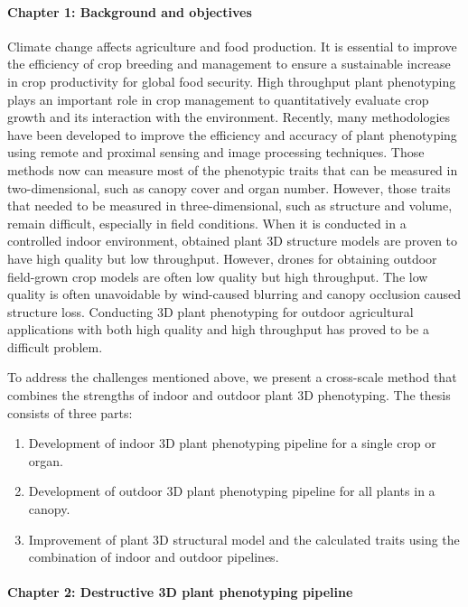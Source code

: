 \begin{eabstract}
  \paragraph{Chapter 1: Background and objectives}

  Climate change affects agriculture and food production. It is essential to improve the efficiency of crop breeding and management to ensure a sustainable increase in crop productivity for global food security. High throughput plant phenotyping plays an important role in crop management to quantitatively evaluate crop growth and its interaction with the environment. Recently, many methodologies have been developed to improve the efficiency and accuracy of plant phenotyping using remote and proximal sensing and image processing techniques. Those methods now can measure most of the phenotypic traits that can be measured in two-dimensional, such as canopy cover and organ number. However, those traits that needed to be measured in three-dimensional, such as structure and volume, remain difficult, especially in field conditions. When it is conducted in a controlled indoor environment, obtained plant 3D structure models are proven to have high quality but low throughput. However, drones for obtaining outdoor field-grown crop models are often low quality but high throughput. The low quality is often unavoidable by wind-caused blurring and canopy occlusion caused structure loss. Conducting 3D plant phenotyping for outdoor agricultural applications with both high quality and high throughput has proved to be a difficult problem.
  
  To address the challenges mentioned above, we present a cross-scale method that combines the strengths of indoor and outdoor plant 3D phenotyping. The thesis consists of three parts: 

  \begin{enumerate}
    \item Development of indoor 3D plant phenotyping pipeline for a single crop or organ.
    \item Development of outdoor 3D plant phenotyping pipeline for all plants in a canopy.
    \item Improvement of plant 3D structural model and the calculated traits using the combination of indoor and outdoor pipelines.
  \end{enumerate}
  
  \paragraph{Chapter 2: Destructive 3D plant phenotyping pipeline}


\end{eabstract}
